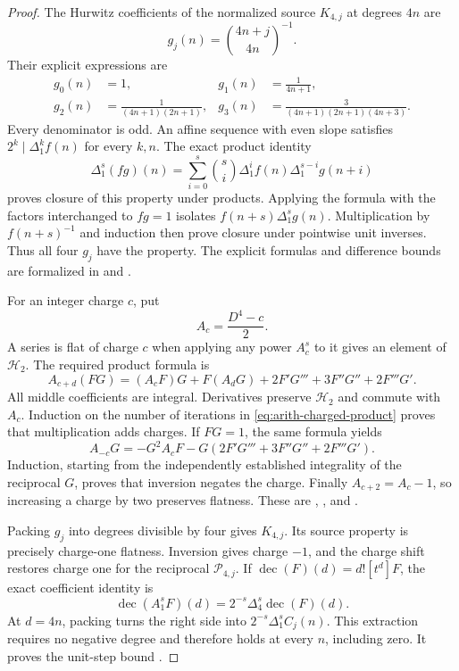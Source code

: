\begin{proof}
The Hurwitz coefficients of the normalized source $K_{4,j}$ at degrees
$4n$ are
\[
 g_j(n)=\binom{4n+j}{4n}^{-1}.
\]
Their explicit expressions are
\[
 \begin{aligned}
 g_0(n)&=1,&
 g_1(n)&=\frac1{4n+1},\\
 g_2(n)&=\frac1{(4n+1)(2n+1)},&
 g_3(n)&=\frac3{(4n+1)(2n+1)(4n+3)}.
 \end{aligned}
\]
Every denominator is odd.  An affine sequence with even slope satisfies
$2^k\mid\Delta_1^k f(n)$ for every $k,n$.  The exact product identity
\[
 \Delta_1^s(fg)(n)=\sum_{i=0}^s\binom si
          \Delta_1^if(n)\Delta_1^{s-i}g(n+i)
\]
proves closure of this property under products.  Applying the formula
with the factors interchanged to $fg=1$ isolates $f(n+s)\Delta_1^sg(n)$.
Multiplication by $f(n+s)^{-1}$ and induction then prove closure under
pointwise unit inverses.
Thus all four $g_j$ have the property.  The explicit formulas and difference
bounds are formalized in
 and
.

For an integer charge $c$, put
\[
 A_c=\frac{D^4-c}{2}.
\]
A series is flat of charge $c$ when applying any power $A_c^s$ to it gives
an element of $\mathcal H_2$.  The required product formula is
\begin{equation}\label{eq:arith-charged-product}
 A_{c+d}(FG)=(A_cF)G+F(A_dG)
       +2F'G'''+3F''G''+2F'''G'.
\end{equation}
All middle coefficients are integral.  Derivatives preserve
$\mathcal H_2$ and commute with $A_c$.  Induction on the number of
iterations in \eqref{eq:arith-charged-product} proves that multiplication
adds charges.  If $FG=1$, the same formula yields
\[
 A_{-c}G=-G^2A_cF-G(2F'G'''+3F''G''+2F'''G').
\]
Induction, starting from the independently established integrality of
the reciprocal $G$, proves that inversion negates the charge.
Finally $A_{c+2}=A_c-1$, so increasing a charge by two preserves flatness.
These are
,
, and
.

Packing $g_j$ into degrees divisible by four gives $K_{4,j}$.
Its source property is precisely charge-one flatness.  Inversion gives
charge $-1$, and the charge shift restores charge one for the
reciprocal $\mathcal P_{4,j}$.  If $\operatorname{dec}(F)(d)=d![t^d]F$, the exact
coefficient identity is
\[
 \operatorname{dec}(A_1^sF)(d)
       =2^{-s}\Delta_4^s\operatorname{dec}(F)(d).
\]
At $d=4n$, packing turns the right side into
$2^{-s}\Delta_1^sC_j(n)$.  This extraction requires no negative degree
and therefore holds at every $n$, including zero.  It proves the unit-step
bound .


\end{proof}
